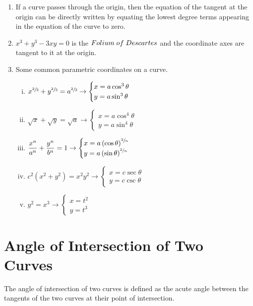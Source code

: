 \documentclass{article}
\begin{document}
\begin{enumerate}
    \item If a curve passes through the origin, then the equation of the tangent at the origin can be directly written by equating the lowest degree terms appearing in the equation of the curve to zero.
    \item $x^3+y^3-3xy=0$ is the $Folium \hspace{1mm} of \hspace{1mm} Descartes$ and the coordinate axes are tangent to it at the origin.
    \item Some common parametric coordinates on a curve.
          \begin{enumerate}[i.]
              \item $x^{\sfrac{2}{3}}+y^{\sfrac{2}{3}}=a^{\sfrac{2}{3}} \rightarrow \begin{cases}
                            x=a \cos^3 \theta \\ y=a \sin ^3 \theta
                        \end{cases}$
              \item $\sqrt{x}+\sqrt{y}=\sqrt{a} \rightarrow \begin{cases}
                            x=a \cos^4 \theta \\ y=a \sin ^4 \theta
                        \end{cases}$
              \item $\dfrac{x^n}{a^n}+\dfrac{y^n}{b^n}=1 \rightarrow \begin{cases}
                            x=a \left(\cos \theta\right)^{\sfrac{2}{n}} \\ y=a \left(\sin \theta\right)^{\sfrac{2}{n}}
                        \end{cases}$
              \item $c^2 \left(x^2+y^2\right)=x^2 y^2 \rightarrow \begin{cases}
                            x=c \sec \theta \\ y= c \csc \theta
                        \end{cases}$
              \item $y^2=x^3 \rightarrow \begin{cases}
                            x=t^2 \\ y=t^3
                        \end{cases}$
          \end{enumerate}
\end{enumerate}
\section{Angle of Intersection of Two Curves}
The angle of intersection of two curves is defined as the acute angle between the tangents of the two curves at their point of intersection.
\end{document}

